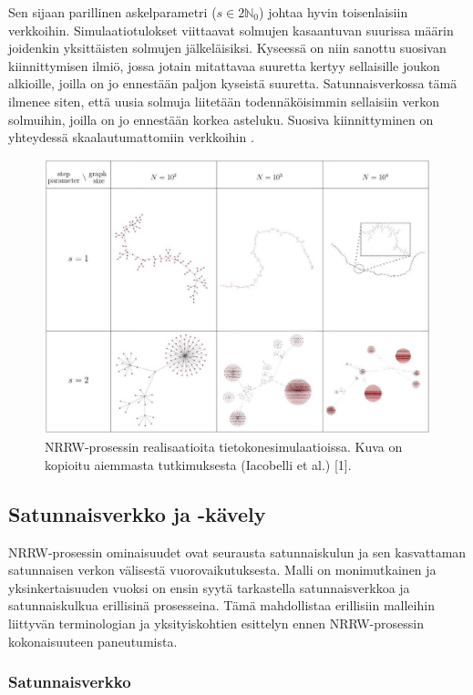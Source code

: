 \documentclass[finnish, 12pt, a4paper, sci, utf8, pdfa]{aaltothesis}
\newcommand{\N}{\mathbb{N}}
\begin{document}
Sen sijaan parillinen askelparametri (\( s \in 2\N_{0} \)) johtaa hyvin toisenlaisiin verkkoihin. Simulaatiotulokset viittaavat solmujen kasaantuvan suurissa määrin joidenkin yksittäisten solmujen jälkeläisiksi. Kyseessä on niin sanottu suosivan kiinnittymisen ilmiö, jossa jotain mitattavaa suuretta kertyy sellaisille joukon alkioille, joilla on jo ennestään paljon kyseistä suuretta. Satunnaisverkossa tämä ilmenee siten, että uusia solmuja liitetään todennäköisimmin sellaisiin verkon solmuihin, joilla on jo ennestään korkea asteluku. Suosiva kiinnittyminen on yhteydessä skaalautumattomiin verkkoihin \cite{Babarasi}.

\begin{figure}[htb]
\centering
\includegraphics[width=.9\textwidth]{pictures/simulations.jpg}
   \caption{NRRW-prosessin realisaatioita tietokonesimulaatioissa. Kuva on kopioitu aiemmasta tutkimuksesta (Iacobelli et al.) [1]. \label{simulaatiot}}
\end{figure}

\subsection{Satunnaisverkko ja -kävely}

NRRW-prosessin ominaisuudet ovat seurausta satunnaiskulun ja sen kasvattaman satunnaisen verkon välisestä vuorovaikutuksesta. Malli on monimutkainen ja yksinkertaisuuden vuoksi on ensin syytä tarkastella satunnaisverkkoa ja satunnaiskulkua erillisinä prosesseina. Tämä mahdollistaa erillisiin malleihin liittyvän terminologian ja yksityiskohtien esittelyn ennen NRRW-prosessin kokonaisuuteen paneutumista.

\subsubsection{Satunnaisverkko}
\end{document}
